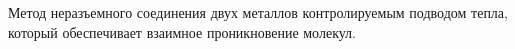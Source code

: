 Метод неразъемного соединения двух металлов контролируемым
подводом тепла, который обеспечивает взаимное проникновение
молекул.